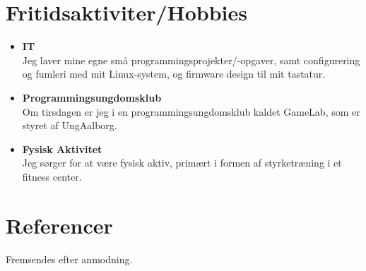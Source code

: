 \documentclass{article}
\begin{document}
    \section*{Fritidsaktiviter/Hobbies}
    \begin{itemize}\setlength\itemsep{0.5em}
        \item[] \textbf{IT}\\
            Jeg laver mine egne små programmingsprojekter/-opgaver, samt configurering og fumleri
            med mit Linux-system, og firmware design til mit tastatur.
        \item[] \textbf{Programmingsungdomsklub}\\
            Om tirsdagen er jeg i en programmingsungdomsklub kaldet GameLab, som er styret af
            UngAalborg.
        \item[] \textbf{Fysisk Aktivitet}\\
            Jeg sørger for at være fysisk aktiv, primært i formen af styrketræning i et fitness center.
    \end{itemize}

    \section*{Referencer}
    Fremsendes efter anmodning.

\end{document}
